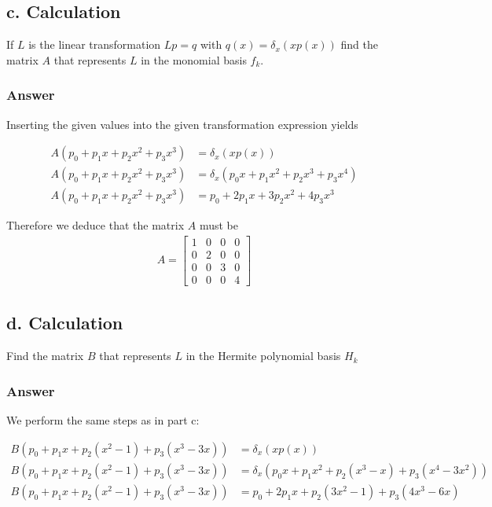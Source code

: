 \documentclass{article}
\begin{document}
		\subsection{c. Calculation}
		
		If $L$ is the linear transformation $Lp=q$ with $q(x)=\delta_{x}(xp(x))$ find the matrix $A$ that represents $L$ in the monomial basis $f_{k}$.
		
		\subsubsection{Answer}
		
		Inserting the given values into the given transformation expression yields
		
		\begin{align*}
			A(p_{0}+p_{1}x+p_{2}x^{2}+p_{3}x^{3})&=\delta_{x}(xp(x))\\
			A(p_{0}+p_{1}x+p_{2}x^{2}+p_{3}x^{3})&=\delta_{x}(p_{0}x+p_{1}x^2+p_{2}x^{3}+p_{3}x^{4})\\
			A(p_{0}+p_{1}x+p_{2}x^{2}+p_{3}x^{3})&=p_{0}+2p_{1}x+3p_{2}x^2+4p_{3}x^{3}
		\end{align*}
		
		Therefore we deduce that the matrix $A$ must be 
		\begin{align*}
		A=
		\begin{bmatrix}
			1 & 0 & 0 & 0\\
			0 & 2 & 0 & 0\\
			0 & 0 & 3 & 0\\
			0 & 0 & 0 & 4
		\end{bmatrix}
		\end{align*}
		\subsection{d. Calculation}
		
		Find the matrix $B$ that represents $L$ in the Hermite polynomial basis $H_{k}$
				
		\subsubsection{Answer}
		We perform the same steps as in part c:
		
		\begin{align*}
		B(p_{0}+p_{1}x+p_{2}(x^{2}-1)+p_{3}(x^{3}-3x))&=\delta_{x}(xp(x))\\
		B(p_{0}+p_{1}x+p_{2}(x^{2}-1)+p_{3}(x^{3}-3x))&=\delta_{x}(p_{0}x+p_{1}x^2+p_{2}(x^{3}-x)+p_{3}(x^{4}-3x^2))\\
		B(p_{0}+p_{1}x+p_{2}(x^{2}-1)+p_{3}(x^{3}-3x))&=p_{0}+2p_{1}x+p_{2}(3x^2-1)+p_{3}(4x^{3}-6x)
		\end{align*}
		
\end{document}
